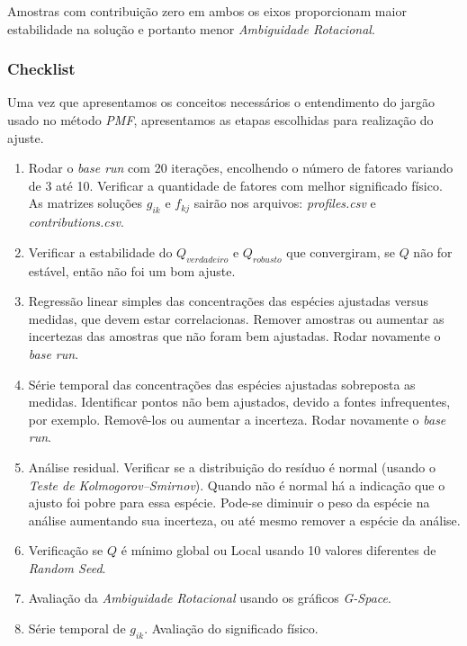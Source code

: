 Amostras com contribuição zero em ambos os eixos proporcionam maior 
estabilidade na solução e portanto menor \textit{Ambiguidade Rotacional}. 

 \subsubsection{Checklist}

Uma vez que apresentamos os conceitos necessários o entendimento do jargão 
usado no método \textit{PMF}, apresentamos as etapas escolhidas para realização 
do ajuste.

\begin{enumerate}
  \item Rodar o \textit{base run} com 20 iterações, encolhendo o número de 
        fatores variando de 3 até 10. 
        Verificar a quantidade de fatores com melhor significado físico. 
        As matrizes soluções $g_{ik}$ e $f_{kj}$ sairão nos arquivos: 
        \textit{profiles.csv} e \textit{contributions.csv}.
  \item Verificar a estabilidade do $Q_{verdadeiro}$ e $Q_{robusto}$ que 
        convergiram, se $Q$ não for estável, então não foi um bom ajuste.
  \item Regressão linear simples das concentrações das espécies ajustadas 
        versus medidas, que devem estar correlacionas. 
        Remover amostras ou aumentar as incertezas das amostras que não foram 
        bem ajustadas. Rodar novamente o \textit{base run}.  
  \item Série temporal das concentrações das espécies ajustadas sobreposta
        as medidas. 
        Identificar pontos não bem ajustados, devido a fontes infrequentes, 
        por exemplo.
        Removê-los ou aumentar a incerteza. Rodar novamente o \textit{base run}.
  \item Análise residual. Verificar se a distribuição do resíduo é normal 
        (usando o \textit{Teste de Kolmogorov–Smirnov}). 
        Quando não é normal há a indicação que o ajusto foi pobre para essa 
        espécie. 
        Pode-se diminuir o peso da espécie na análise aumentando sua incerteza, 
        ou até mesmo remover a espécie da análise.
  \item Verificação se $Q$ é mínimo global ou Local usando 10 valores 
        diferentes de \textit{Random Seed}.
  \item Avaliação da \textit{Ambiguidade Rotacional} usando os 
        gráficos \textit{G-Space}.
  \item Série temporal de $g_{ik}$. Avaliação do significado físico.
\end{enumerate}

